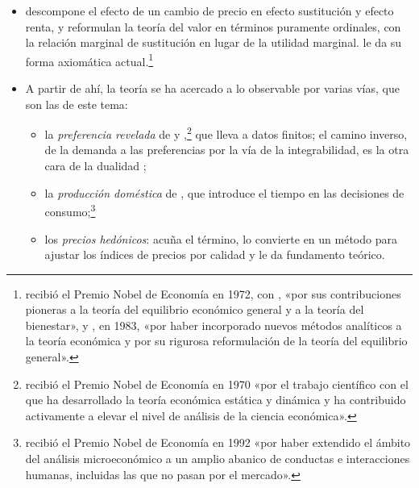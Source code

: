 \documentclass[11pt]{article}
\begin{document}
\begin{itemize}
\begin{itemize}
\begin{itemize}
    \end{itemize}
  \item \textcite{Slutsky1915Bilancio} descompone el efecto de un cambio de precio en efecto sustitución y efecto renta, y \textcite{HicksAllen1934Reconsideration} reformulan la teoría del valor en términos puramente ordinales, con la relación marginal de sustitución en lugar de la utilidad marginal. \textcite{Debreu1959Theory} le da su forma axiomática actual.\footnote{ recibió el Premio Nobel de Economía en 1972, con , «por sus contribuciones pioneras a la teoría del equilibrio económico general y a la teoría del bienestar»\nocite{Nobel1972HicksArrow}, y , en 1983, «por haber incorporado nuevos métodos analíticos a la teoría económica y por su rigurosa reformulación de la teoría del equilibrio general»\nocite{Nobel1983Debreu}.}
  \item A partir de ahí, la teoría se ha acercado a lo observable por varias vías, que son las de este tema:
    \begin{itemize}
    \item la \emph{preferencia revelada} de \textcite{Samuelson1938Note,Samuelson1948Consumption} y \textcite{Houthakker1950Revealed},\footnote{ recibió el Premio Nobel de Economía en 1970 «por el trabajo científico con el que ha desarrollado la teoría económica estática y dinámica y ha contribuido activamente a elevar el nivel de análisis de la ciencia económica»\nocite{Nobel1970Samuelson}.} que \textcite{Afriat1967Construction} lleva a datos finitos; el camino inverso, de la demanda a las preferencias por la vía de la integrabilidad\nocite{Antonelli1886Teoria,HurwiczUzawa1971Integrability,KihlstromMasColellSonnenschein1976}, es la otra cara de la dualidad ;
    \item la \emph{producción doméstica} de \textcite{Becker1965Allocation}, que introduce el tiempo en las decisiones de consumo;\footnote{ recibió el Premio Nobel de Economía en 1992 «por haber extendido el ámbito del análisis microeconómico a un amplio abanico de conductas e interacciones humanas, incluidas las que no pasan por el mercado»\nocite{Nobel1992Becker}.}
    \item los \emph{precios hedónicos}: \textcite{Court1939Hedonic} acuña el término, \textcite{Griliches1961Hedonic} lo convierte en un método para ajustar los índices de precios por calidad y \textcite{Rosen1974Hedonic} le da fundamento teórico.
    \end{itemize}
  \end{itemize}


\end{itemize}
\end{document}
